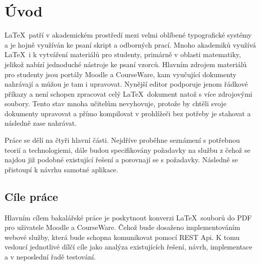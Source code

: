 \chapter{Úvod}
\LaTeX\ patří v akademickém prostředí mezi velmi oblíbené typografické systémy a je hojně využíván ke psaní skript a odborných prací. Mnoho akademiků využívá \LaTeX\ i k vytváření materiálů pro studenty, primárně v oblasti matematiky, jelikož nabízí jednoduché nástroje ke psaní vzorců. Hlavním zdrojem materiálů pro studenty jsou portály Moodle a CourseWare, kam vyučující dokumenty nahrávají a můžou je tam i upravovat. Nynější editor podporuje jenom řádkové příkazy a není schopen zpracovat celý \LaTeX\ dokument natož s více zdrojovými soubory. Tento stav mnoha učitelům nevyhovuje, protože by chtěli svoje dokumenty upravovat a přímo kompilovat v prohlížeči bez potřeby je stahovat a následně zase nahrávat. 



Práce se dělí na čtyři hlavní části. Nejdříve proběhne seznámení s potřebnou teorií a technologiemi, dále budou specifikovány požadavky na službu z čehož se najdou již podobné existující řešení a porovnají se s požadavky. Následně se přistoupí k návrhu samotné aplikace.


\section{Cíle práce}
Hlavním cílem bakalářské práce je poskytnout konverzi \LaTeX\ souborů do PDF pro uživatele Moodle a CourseWare. Čehož bude dosaženo implementováním webové služby, která bude schopna komunikovat pomocí REST Api. K tomu vedoucí jednotlivé dílčí cíle jako analýza existujících řešení, návrh, implementace a v neposlední řadě testování. 